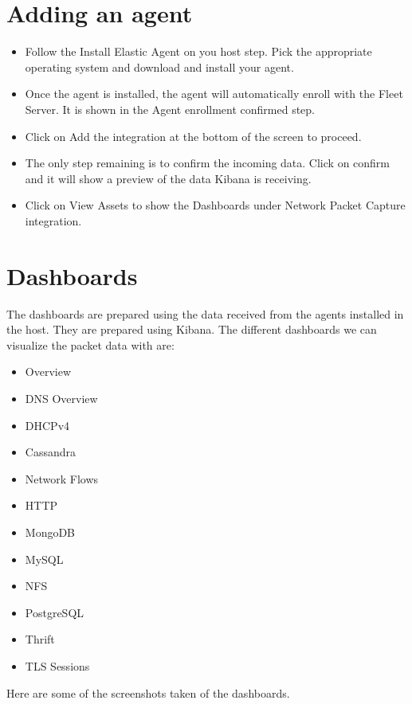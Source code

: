 \documentclass{report}
\begin{document}
\section{Adding an agent}
\begin{itemize}
	\item Follow the Install Elastic Agent on you host step. 
	Pick the appropriate operating system and download and install your agent.
	\item Once the agent is installed, the agent will automatically enroll with the Fleet Server.
	It is shown in the Agent enrollment confirmed step.
	\item Click on Add the integration at the bottom of the screen to proceed.
	\item The only step remaining is to confirm the incoming data. Click on confirm and it will show a preview of the 
	data Kibana is receiving.
	\item Click on View Assets to show the Dashboards under Network Packet Capture integration.
\end{itemize}

\section{Dashboards}
The dashboards are prepared using the data received from the agents installed in the host. 
They are prepared using Kibana.
The different dashboards we can visualize the packet data with are:
\begin{itemize}
	\item Overview
	\item DNS Overview
	\item DHCPv4
	\item Cassandra
	\item Network Flows
	\item HTTP
	\item MongoDB
	\item MySQL
	\item NFS
	\item PostgreSQL
	\item Thrift
	\item TLS Sessions
\end{itemize}
Here are some of the screenshots taken of the dashboards.
\end{document}
